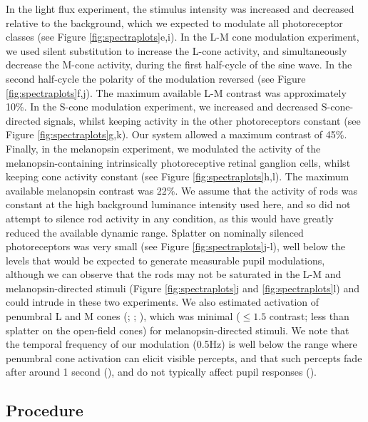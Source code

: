 \documentclass[
]{article}
\begin{document}
In the light flux experiment, the stimulus intensity was increased and decreased relative to the background, which we expected to modulate all photoreceptor classes (see Figure \ref{fig:spectraplots}e,i). In the L-M cone modulation experiment, we used silent substitution to increase the L-cone activity, and simultaneously decrease the M-cone activity, during the first half-cycle of the sine wave. In the second half-cycle the polarity of the modulation reversed (see Figure \ref{fig:spectraplots}f,j). The maximum available L-M contrast was approximately 10\%. In the S-cone modulation experiment, we increased and decreased S-cone-directed signals, whilst keeping activity in the other photoreceptors constant (see Figure \ref{fig:spectraplots}g,k). Our system allowed a maximum contrast of 45\%. Finally, in the melanopsin experiment, we modulated the activity of the melanopsin-containing intrinsically photoreceptive retinal ganglion cells, whilst keeping cone activity constant (see Figure \ref{fig:spectraplots}h,l). The maximum available melanopsin contrast was 22\%. We assume that the activity of rods was constant at the high background luminance intensity used here, and so did not attempt to silence rod activity in any condition, as this would have greatly reduced the available dynamic range. Splatter on nominally silenced photoreceptors was very small (see Figure \ref{fig:spectraplots}j-l), well below the levels that would be expected to generate measurable pupil modulations, although we can observe that the rods may not be saturated in the L-M and melanopsin-directed stimuli (Figure \ref{fig:spectraplots}j and \ref{fig:spectraplots}l) and could intrude in these two experiments. We also estimated activation of penumbral L and M cones (; ; ), which was minimal (\(\le 1.5%
\) contrast; less than splatter on the open-field cones) for melanopsin-directed stimuli. We note that the temporal frequency of our modulation (0.5Hz) is well below the range where penumbral cone activation can elicit visible percepts, and that such percepts fade after around 1 second (), and do not typically affect pupil responses ().

\subsection{Procedure}\label{procedure}
\end{document}
